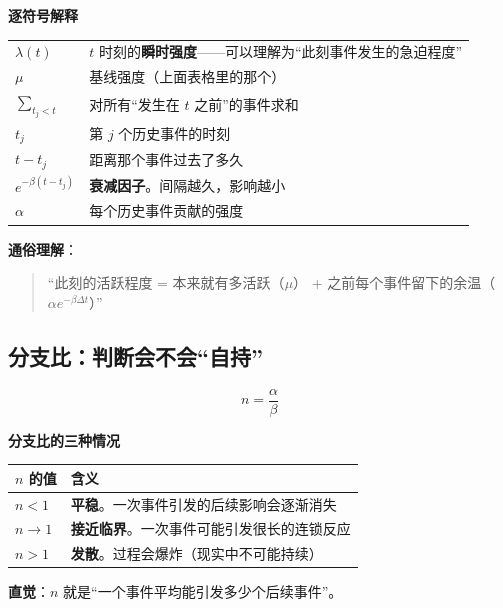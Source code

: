\documentclass[UTF8,a4paper,11pt]{ctexart}
\newenvironment{explainbox}[1]
{\begin{center}\begin{minipage}{0.94\textwidth}\colorbox{boxbg}{\parbox{0.92\textwidth}{\textbf{#1}\par\vspace{2pt}}}}
{\end{minipage}\end{center}}
\newcommand{\hl}[1]{\textcolor{blue!70!black}{\textbf{#1}}}
\newcommand{\warn}[1]{\textcolor{red!70!black}{\textbf{#1}}}
\begin{document}
\begin{explainbox}{逐符号解释}
\begin{longtable}{@{}p{2.2cm}p{11.6cm}@{}}
$\lambda(t)$ & $t$ 时刻的\hl{瞬时强度}——可以理解为“此刻事件发生的急迫程度” \\
$\mu$ & 基线强度（上面表格里的那个） \\
$\sum_{t_j<t}$ & 对所有“发生在 $t$ 之前”的事件求和 \\
$t_j$ & 第 $j$ 个历史事件的时刻 \\
$t - t_j$ & 距离那个事件过去了多久 \\
$e^{-\beta(t-t_j)}$ & \hl{衰减因子}。间隔越久，影响越小 \\
$\alpha$ & 每个历史事件贡献的强度 \\
\end{longtable}
\end{explainbox}

\textbf{通俗理解}：

\begin{quote}
“此刻的活跃程度 = 本来就有多活跃（$\mu$）
+ 之前每个事件留下的余温（$\alpha e^{-\beta\Delta t}$）”
\end{quote}

\subsection{分支比：判断会不会“自持”}

\begin{equation}
n = \frac{\alpha}{\beta}
\label{p2:eq:branching}
\end{equation}

\begin{explainbox}{分支比的三种情况}
\begin{center}
\begin{tabular}{p{2.6cm}p{10.2cm}}
\toprule
$n$ 的值 & 含义 \\
\midrule
$n < 1$ & \hl{平稳}。一次事件引发的后续影响会逐渐消失 \\
$n \to 1$ & \warn{接近临界}。一次事件可能引发很长的连锁反应 \\
$n > 1$ & \warn{发散}。过程会爆炸（现实中不可能持续） \\
\bottomrule
\end{tabular}
\end{center}
\textbf{直觉}：$n$ 就是“一个事件平均能引发多少个后续事件”。
\end{explainbox}

\newpage
\end{document}
